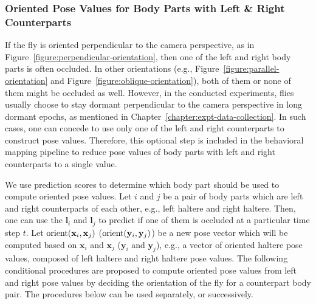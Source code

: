 \subsubsection{Oriented Pose Values for Body Parts with Left \& Right Counterparts}
If the fly is oriented perpendicular to the camera perspective, as in Figure~\ref{figure:perpendicular-orientation}, then one of the left and right body parts is often occluded.
In other orientations (e.g., Figure~\ref{figure:parallel-orientation} and Figure~\ref{figure:oblique-orientation}),  both of them or none of them might be occluded as well.
However, in the conducted experiments, flies usually choose to stay dormant perpendicular to the camera perspective in long dormant epochs, as mentioned in Chapter~\ref{chapter:expt-data-collection}.
In such cases, one can concede to use only one of the left and right counterparts to construct pose values.
Therefore, this optional step is included in the behavioral mapping pipeline to reduce pose values of body parts with left and right counterparts to a single value.

We use prediction scores to determine which body part should be used to compute oriented pose values.
Let $i$ and $j$ be a pair of body parts which are left and right counterparts of each other, e.g., left haltere and right haltere.
Then, one can use the $\mathbf{l}_i$ and $\mathbf{l}_j$ to predict if one of them is occluded at a particular time step $t$.
Let $\mathop{\rm{orient}}(\mathbf{x}_i, \mathbf{x}_j)$ ($\mathop{\rm{orient}}(\mathbf{y}_i, \mathbf{y}_j)$) be a new pose vector which will be computed based on $\mathbf{x}_i$ and $\mathbf{x}_j$ ($\mathbf{y}_i$ and $\mathbf{y}_j$), e.g., a vector of oriented haltere pose values, composed of left haltere and right haltere pose values.
The following conditional procedures are proposed to compute oriented pose values from left and right pose values by deciding the orientation of the fly for a counterpart body pair. The procedures below can be used separately, or successively.

